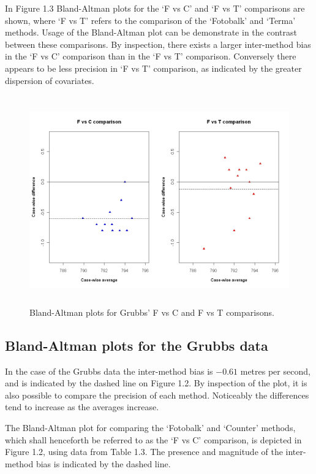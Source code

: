 \documentclass[Main.tex]{subfiles}
\begin{document}
In Figure 1.3 Bland-Altman plots for the `F vs C' and `F vs T'
comparisons are shown, where `F vs T' refers to the comparison of
the `Fotobalk' and `Terma' methods. Usage of the Bland-Altman plot
can be demonstrate in the contrast between these comparisons. By inspection, there exists a larger inter-method bias in the `F vs C' comparison than in the `F vs T' comparison. Conversely there
appears to be less precision in `F vs T' comparison, as indicated
by the greater dispersion of covariates.

\begin{figure}[h!]
	\begin{center}
		\includegraphics[height=90mm]{images/GrubbsDataTwoBAplots.jpeg}
		\caption{Bland-Altman plots for Grubbs' F vs C and F vs T comparisons.}\label{GrubbsDataTwoBAplots}
	\end{center}
\end{figure}

\newpage


\subsection{Bland-Altman plots for the Grubbs data}

In the case of the Grubbs data the inter-method bias is $-0.61$ metres per second, and is indicated by the dashed line on Figure 1.2. By inspection of the plot, it is also possible to compare the precision of each method. Noticeably the differences tend to increase as the averages increase.


The Bland-Altman plot for comparing the `Fotobalk' and `Counter'
methods, which shall henceforth be referred to as the `F vs C'
comparison,  is depicted in Figure 1.2, using data from Table 1.3.
The presence and magnitude of the inter-method bias is indicated
by the dashed line.
\newpage
\end{document}
